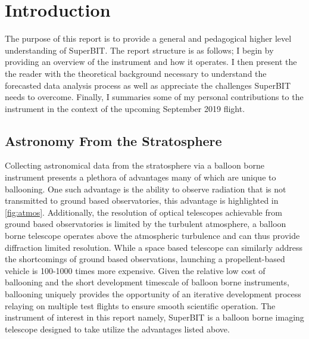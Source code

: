 \chapter{Introduction}

The purpose of this report is to provide a general and pedagogical higher level understanding of SuperBIT. The report structure is as follows; I begin by providing an overview of the instrument and how it operates. I then present the the reader with the theoretical background necessary to understand the forecasted data analysis process as well as appreciate the challenges SuperBIT needs to overcome. Finally, I summaries some of my personal contributions to the instrument in the context of the upcoming September 2019 flight. 
  

\section{Astronomy From the Stratosphere}
Collecting astronomical data from the stratosphere via a balloon borne instrument presents a plethora of advantages many of which are unique to ballooning. One such advantage is the ability to observe radiation that is not transmitted to ground based observatories, this advantage is highlighted in \autoref{fig:atmos}. Additionally, the resolution of optical telescopes achievable from ground based observatories is limited by the turbulent atmosphere, a balloon borne telescope operates above the atmospheric turbulence and can thus provide diffraction limited resolution. While a space based telescope can similarly address the shortcomings of ground based observations, launching a propellent-based vehicle is 100-1000 times more expensive. Given the relative low cost of ballooning and the short development timescale of balloon borne instruments, ballooning uniquely provides the opportunity of an iterative development process relaying on multiple test flights to ensure smooth scientific operation. The instrument of interest in this report namely, SuperBIT is a balloon borne imaging telescope designed to take utilize the advantages listed above.

